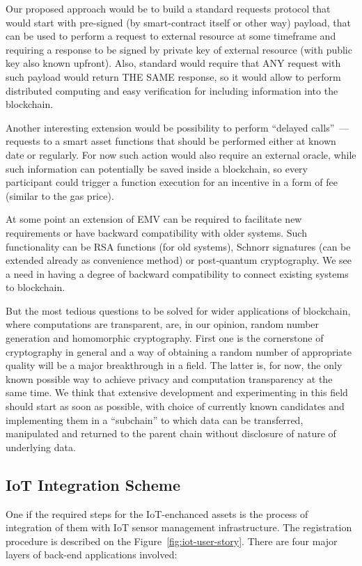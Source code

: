 \documentclass{article}
\begin{document}
\begin{multicols}{2}
Our proposed approach would be to build a standard requests protocol that would start with pre-signed (by smart-contract itself or other way) payload, that can be used to perform a request to external resource at some timeframe and requiring a response to be signed by private key of external resource (with public key also known upfront). Also, standard would require that ANY request with such payload would return THE SAME response, so it would allow to perform distributed computing and easy verification for including information into the blockchain.

Another interesting extension would be possibility to perform \enquote{delayed calls}~--- requests to a smart asset functions that should be performed either at known date or regularly. For now such action would also require an external oracle, while such information can potentially be saved inside a blockchain, so every participant could trigger a function execution for an incentive in a form of fee (similar to the gas price).

At some point an extension of EMV can be required to facilitate new requirements or have backward compatibility with older systems. Such functionality can be RSA functions (for old systems), Schnorr signatures (can be extended already as convenience method) or post-quantum cryptography. We see a need in having a degree of backward compatibility to connect existing systems to blockchain.

But the most tedious questions to be solved for wider applications of blockchain, where computations are transparent, are, in our opinion, random number generation and homomorphic cryptography. First one is the cornerstone of cryptography in general and a way of obtaining a random number of appropriate quality will be a major breakthrough in a field. The latter is, for now, the only known possible way to achieve privacy and computation transparency at the same time. We think that extensive development and experimenting in this field should start as soon as possible, with choice of currently known candidates and implementing them in a \enquote{subchain} to which data can be transferred, manipulated and returned to the parent chain without disclosure of nature of underlying data.

\subsection{IoT Integration Scheme}

One if the required steps for the IoT-enchanced assets is the process of integration of them with IoT sensor management infrastructure. The registration procedure is described on the Figure~\ref{fig:iot-user-story}.
There are four major layers of back-end applications involved:


\end{multicols}
\end{document}
